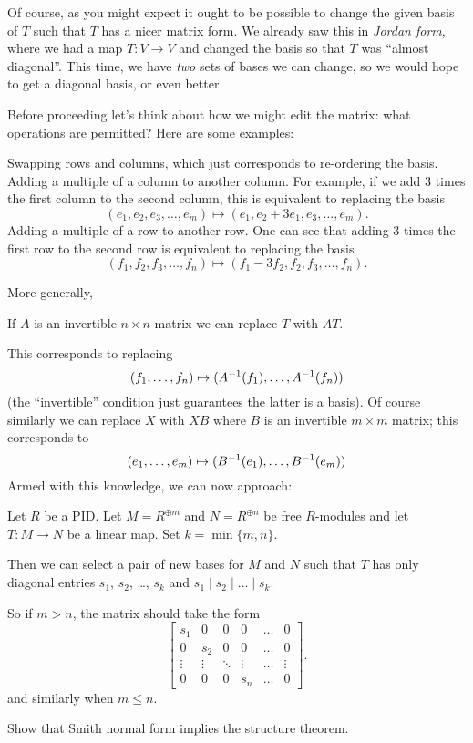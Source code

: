 Of course, as you might expect it ought to be possible to change the
given basis of $T$ such that $T$ has a nicer matrix form.
We already saw this in \emph{Jordan form},
where we had a map $T \colon V \to V$ and changed the basis
so that $T$ was ``almost diagonal''.
This time, we have \emph{two} sets of bases we can change,
so we would hope to get a diagonal basis, or even better.

Before proceeding let's think about how we might edit the matrix:
what operations are permitted?  Here are some examples:
\begin{itemize}
	\ii Swapping rows and columns, which just corresponds
	to re-ordering the basis.
	\ii Adding a multiple of a column to another column.
	For example, if we add $3$ times the first column to the second column,
	this is equivalent to replacing the basis
	\[ (e_1, e_2, e_3, \dots, e_m) \mapsto (e_1, e_2+3e_1, e_3, \dots, e_m). \]
	\ii Adding a multiple of a row to another row.
	One can see that adding $3$ times the first row to the second row
	is equivalent to replacing the basis
	\[ (f_1, f_2, f_3, \dots, f_n) \mapsto (f_1-3f_2, f_2, f_3, \dots, f_n). \]
\end{itemize}
More generally,
\begin{moral}
	If $A$ is an invertible $n \times n$ matrix we can
	replace $T$ with $AT$.
\end{moral}
This corresponds to replacing
\[ (f_1, \dots, f_n) \mapsto (A^{-1}(f_1), \dots, A^{-1}(f_n)) \]
(the ``invertible'' condition just guarantees the latter is a basis).
Of course similarly we can replace $X$ with $XB$
where $B$ is an invertible $m \times m$ matrix;
this corresponds to
\[ (e_1, \dots, e_m) \mapsto (B^{-1}(e_1), \dots, B^{-1}(e_m)) \]
Armed with this knowledge, we can now approach:
\begin{theorem}
	Let $R$ be a PID.
	Let $M = R^{\oplus m}$ and $N = R^{\oplus n}$ be free $R$-modules
	and let $T \colon M \to N$ be a linear map.
	Set $k = \min\{m,n\}$.

	Then we can select a pair of new bases for $M$ and $N$ such that
	$T$ has only diagonal entries $s_1$, $s_2$, \dots, $s_k$
	and $s_1 \mid s_2 \mid \dots \mid s_k$.
\end{theorem}
So if $m > n$, the matrix should take the form
\[
	\begin{bmatrix}
		s_1 & 0 & 0 & 0 & \dots & 0 \\
		0 & s_2 & 0 & 0 & \dots & 0 \\
		\vdots & \vdots & \ddots & \vdots & \dots & \vdots \\
		0 & 0 & 0 & s_n & \dots & 0
	\end{bmatrix}.
\]
and similarly when $m \le n$.
\begin{ques}
	Show that Smith normal form implies the structure theorem.
\end{ques}

